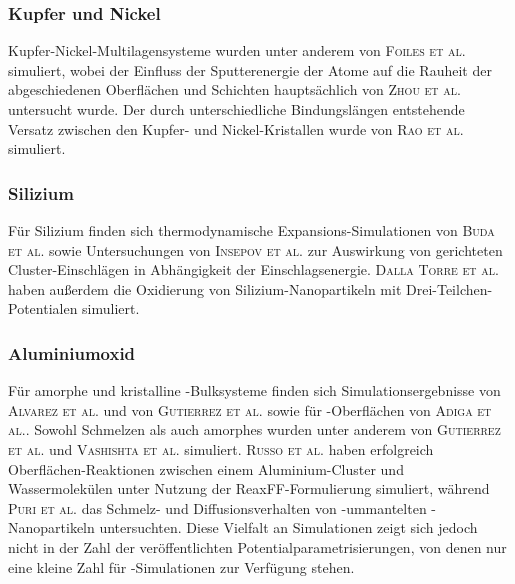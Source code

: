 \subsubsection{Kupfer und Nickel}
Kupfer-Nickel-Multilagensysteme wurden unter anderem von \textsc{Foiles et al.}\cite{foiles_calculation_1985} simuliert, wobei der Einfluss der Sputterenergie der Atome auf die Rauheit der abgeschiedenen Oberflächen und Schichten hauptsächlich von \textsc{Zhou et al.}\cite{zhou_atomistic_1998} untersucht wurde.
Der durch unterschiedliche Bindungslängen entstehende Versatz zwischen den Kupfer- und Nickel-Kristallen wurde von \textsc{Rao et al.}\cite{rao_atomistic_2000} simuliert.

\subsubsection{Silizium}
Für Silizium finden sich thermodynamische Expansions-Simulationen von \textsc{Buda et al.}\cite{buda_thermal_1990} sowie Untersuchungen von \textsc{Insepov et al.}\cite{insepov_molecular_1995} zur Auswirkung von gerichteten Cluster-Ein\-schlägen in Abhängigkeit der Einschlagsenergie.
\textsc{Dalla Torre et al.}\cite{dalla_torre_study_2002} haben außerdem die Oxidierung von Silizium-Nanopartikeln mit Drei-Teilchen-Potentialen simuliert.

\subsubsection{Aluminiumoxid}
Für amorphe und kristalline -Bulksysteme finden sich Simulationsergebnisse von \textsc{Alvarez et al.}\cite{alvarez_computer_1995,alvarez_molecular_1992} und von \textsc{Gutierrez et al.}\cite{gutierrez_molecular_2002} sowie für -Oberflächen von \textsc{Adiga et al.}\cite{adiga_atomistic_2006}.
Sowohl Schmelzen als auch amorphes  wurden unter anderem von \textsc{Gutierrez et al.}\cite{gutierrez_structural_2000} und \textsc{Vashishta et al.}\cite{vashishta_interaction_2008} simuliert.
\textsc{Russo et al.}\cite{russo_molecular_2011} haben erfolgreich Oberflächen-Reaktionen zwischen einem Aluminium-Cluster und Wassermolekülen unter Nutzung der ReaxFF-Formulierung simuliert, während \textsc{Puri et al.}\cite{puri_thermo-mechanical_2010} das Schmelz- und Diffusionsverhalten von -ummantelten -Nanopartikeln untersuchten.
Diese Vielfalt an Simulationen zeigt sich jedoch nicht in der Zahl der veröffentlichten Potentialparametrisierungen, von denen nur eine kleine Zahl für -Simulationen zur Verfügung stehen.

